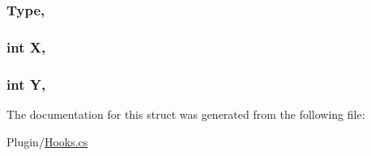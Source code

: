 \subsubsection[{Type}]{ Type\hspace{0.3cm}{\ttfamily [get]}, {\ttfamily [set]}}\label{structOTA_1_1Plugin_1_1HookArgs_1_1PlayerTriggeredEvent_a21295060ce882c0bfc4d1f34db3bfc01}
\hypertarget{structOTA_1_1Plugin_1_1HookArgs_1_1PlayerTriggeredEvent_a80c0944640e62d3ed6c5419c1bcc0c88}{}
\subsubsection[{X}]{\setlength{\rightskip}{0pt plus 5cm}int X\hspace{0.3cm}{\ttfamily [get]}, {\ttfamily [set]}}\label{structOTA_1_1Plugin_1_1HookArgs_1_1PlayerTriggeredEvent_a80c0944640e62d3ed6c5419c1bcc0c88}
\hypertarget{structOTA_1_1Plugin_1_1HookArgs_1_1PlayerTriggeredEvent_aa482c4cc86a24474e4fb19b5b5978778}{}
\subsubsection[{Y}]{\setlength{\rightskip}{0pt plus 5cm}int Y\hspace{0.3cm}{\ttfamily [get]}, {\ttfamily [set]}}\label{structOTA_1_1Plugin_1_1HookArgs_1_1PlayerTriggeredEvent_aa482c4cc86a24474e4fb19b5b5978778}


The documentation for this struct was generated from the following file\+:\begin{DoxyCompactItemize}
\item 
Plugin/\hyperlink{Hooks_8cs}{Hooks.\+cs}\end{DoxyCompactItemize}
